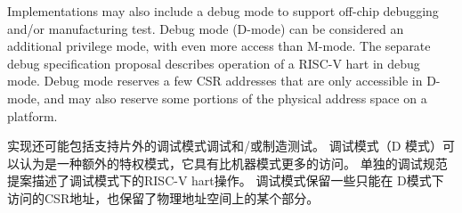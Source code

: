 Implementations may also include a debug mode to support off-chip
debugging and/or manufacturing test.  Debug mode (D-mode) can be
considered an additional privilege mode, with even more access than
M-mode. The separate debug specification proposal describes operation
of a RISC-V hart in debug mode.  Debug mode reserves a few CSR
addresses that are only accessible in D-mode, and may also reserve
some portions of the physical address space on a platform.

实现还可能包括支持片外的调试模式调试和/或制造测试。 
调试模式（D 模式）可以认为是一种额外的特权模式，它具有比机器模式更多的访问。
单独的调试规范提案描述了调试模式下的RISC-V hart操作。 调试模式保留一些只能在
D模式下访问的CSR地址，也保留了物理地址空间上的某个部分。

